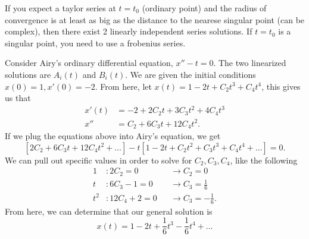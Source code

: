 \begin{theorem}
  If you expect a taylor series at $t=t_0$ (ordinary point) and the radius of convergence is at least as big as the distance to the nearese singular point (can be complex), then there exist 2 linearly independent series solutions. If $t=t_0$ is a singular point, you need to use a frobenius series.
\end{theorem}
\begin{eg}
  Consider Airy's ordinary differential equation, $x''-t=0$. The two linearized solutions are $A_i(t)$ and $B_i(t)$. We are given the initial conditions $x(0)=1,x'(0)=-2$. From here, let $x(t)=1-2t+C_2t^3+C_4t^{4}$, this gives us that 
  \begin{align*}
    x'(t)&=-2+2C_2t+3C_3t^2+4C_4t^3\\
    x''&=C_2+6C_3t+12C_4t^2
  .\end{align*}
  If we plug the equations above into Airy's equation, we get
  \[
  \left[ 2C_2+6C_3t+12C_4t^2+\ldots \right]-t\left[ 1-2t+C_2t^2+C_3t^3+C_4t ^{4}+\ldots \right] =0
  .\] 
  We can pull out specific values in order to solve for $C_2,C_3,C_4$, like the following 
  \begin{align*}
    1&:2C_2=0 &&\to C_2=0\\
    t&:6C_3-1=0&&\to C_3=\frac{1}{6}\\
    t^2&:12C_4+2=0&&\to C_3=-\frac{1}{6}
  .\end{align*}
  From here, we can determine that our general solution is 
  \begin{equation*}
    \boxed{x(t)=1-2t+\frac{1}{6}t^3-\frac{1}{6}t ^{4}+\ldots}
  \end{equation*}
\end{eg}
